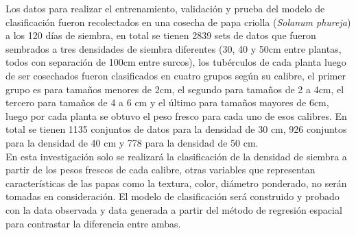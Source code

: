 Los datos para realizar el entrenamiento, validación y prueba del modelo de clasificación fueron recolectados en una cosecha de papa criolla (\textit{Solanum phureja}) a los 120 días de siembra, en total se tienen 2839 sets de datos que fueron sembrados a tres densidades de siembra diferentes (30, 40 y 50cm entre plantas, todos con separación de 100cm entre surcos), los tubérculos de cada planta luego de ser cosechados fueron clasificados en cuatro grupos según su calibre, el primer grupo es para tamaños menores de 2cm, el segundo para tamaños de 2 a 4cm, el tercero para tamaños de 4 a 6 cm y el último para tamaños mayores de 6cm, luego por cada planta se obtuvo el peso fresco para cada uno de esos calibres. En total se tienen 1135 conjuntos de datos para la densidad de 30 cm, 926 conjuntos para la densidad de 40 cm y 778 para la densidad de 50 cm.\\

En esta investigación solo se realizará la clasificación de la densidad de siembra a partir de los pesos frescos de cada calibre, otras variables que representan características de las papas como la textura, color, diámetro ponderado, no serán tomadas en consideración. El modelo de clasificación será construido y probado con la data observada y data generada a partir del método de regresión espacial para contrastar la diferencia entre ambas.
